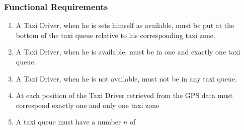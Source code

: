 \subsubsection{Functional Requirements}
\begin{enumerate}
\item A Taxi Driver, when he is sets himself as available, must be put at the bottom of the taxi queue relative to his corresponding taxi zone.
\item A Taxi Driver, when he is available, must be in one and exactly one taxi queue.
\item A Taxi Driver, when he is not available, must not be in any taxi queue.
\item At each position of the Taxi Driver retrieved from the GPS data must correspond exactly one and only one taxi zone
\item A taxi queue must have a number $n$ of 
\end{enumerate}
